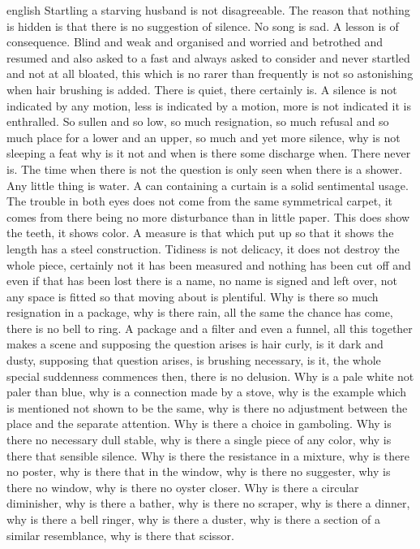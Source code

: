 \begin{otherlanguage*}{english}
Startling a starving husband is not disagreeable. The reason that nothing is hidden is that there is no suggestion of silence. No song is sad. A lesson is of consequence.
Blind and weak and organised and worried and betrothed and resumed and also asked to a fast and always asked to consider and never startled and not at all bloated, this which is no rarer than frequently is not so astonishing when hair brushing is added. There is quiet, there certainly is.
A silence is not indicated by any motion, less is indicated by a motion, more is not indicated it is enthralled. So sullen and so low, so much resignation, so much refusal and so much place for a lower and an upper, so much and yet more silence, why is not sleeping a feat why is it not and when is there some discharge when. There never is.
The time when there is not the question is only seen when there is a shower. Any little thing is water.
A can containing a curtain is a solid sentimental usage. The trouble in both eyes does not come from the same symmetrical carpet, it comes from there being no more disturbance than in little paper. This does show the teeth, it shows color.
A measure is that which put up so that it shows the length has a steel construction. Tidiness is not delicacy, it does not destroy the whole piece, certainly not it has been measured and nothing has been cut off and even if that has been lost there is a name, no name is signed and left over, not any space is fitted so that moving about is plentiful. Why is there so much resignation in a package, why is there rain, all the same the chance has come, there is no bell to ring.
A package and a filter and even a funnel, all this together makes a scene and supposing the question arises is hair curly, is it dark and dusty, supposing that question arises, is brushing necessary, is it, the whole special suddenness commences then, there is no delusion.
Why is a pale white not paler than blue, why is a connection made by a stove, why is the example which is mentioned not shown to be the same, why is there no adjustment between the place and the separate attention. Why is there a choice in gamboling. Why is there no necessary dull stable, why is there a single piece of any color, why is there that sensible silence. Why is there the resistance in a mixture, why is there no poster, why is there that in the window, why is there no suggester, why is there no window, why is there no oyster closer. Why is there a circular diminisher, why is there a bather, why is there no scraper, why is there a dinner, why is there a bell ringer, why is there a duster, why is there a section of a similar resemblance, why is there that scissor.

\end{otherlanguage*}

